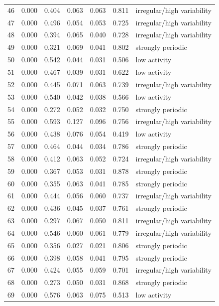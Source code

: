 \begin{longtable}{lrrrrrl}
46 & 0.000 & 0.404 & 0.063 & 0.063 & 0.811 & irregular/high variability \\
47 & 0.000 & 0.496 & 0.054 & 0.053 & 0.725 & irregular/high variability \\
48 & 0.000 & 0.394 & 0.065 & 0.040 & 0.728 & irregular/high variability \\
49 & 0.000 & 0.321 & 0.069 & 0.041 & 0.802 & strongly periodic \\
50 & 0.000 & 0.542 & 0.044 & 0.031 & 0.506 & low activity \\
51 & 0.000 & 0.467 & 0.039 & 0.031 & 0.622 & low activity \\
52 & 0.000 & 0.445 & 0.071 & 0.063 & 0.739 & irregular/high variability \\
53 & 0.000 & 0.540 & 0.042 & 0.038 & 0.566 & low activity \\
54 & 0.000 & 0.272 & 0.052 & 0.032 & 0.750 & strongly periodic \\
55 & 0.000 & 0.593 & 0.127 & 0.096 & 0.756 & irregular/high variability \\
56 & 0.000 & 0.438 & 0.076 & 0.054 & 0.419 & low activity \\
57 & 0.000 & 0.464 & 0.044 & 0.034 & 0.786 & strongly periodic \\
58 & 0.000 & 0.412 & 0.063 & 0.052 & 0.724 & irregular/high variability \\
59 & 0.000 & 0.367 & 0.053 & 0.031 & 0.878 & strongly periodic \\
60 & 0.000 & 0.355 & 0.063 & 0.041 & 0.785 & strongly periodic \\
61 & 0.000 & 0.444 & 0.056 & 0.060 & 0.737 & irregular/high variability \\
62 & 0.000 & 0.436 & 0.045 & 0.037 & 0.761 & strongly periodic \\
63 & 0.000 & 0.297 & 0.067 & 0.050 & 0.811 & irregular/high variability \\
64 & 0.000 & 0.546 & 0.060 & 0.061 & 0.779 & irregular/high variability \\
65 & 0.000 & 0.356 & 0.027 & 0.021 & 0.806 & strongly periodic \\
66 & 0.000 & 0.398 & 0.058 & 0.041 & 0.795 & strongly periodic \\
67 & 0.000 & 0.424 & 0.055 & 0.059 & 0.701 & irregular/high variability \\
68 & 0.000 & 0.273 & 0.050 & 0.031 & 0.868 & strongly periodic \\
69 & 0.000 & 0.576 & 0.063 & 0.075 & 0.513 & low activity \\

\end{longtable}
